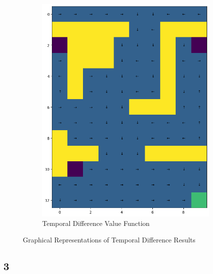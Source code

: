 \begin{figure}[H]
\begin{subfigure}[b]{0.49\textwidth}
        \centering
        \includegraphics[width=\textwidth]{assets/td/td_policy.png}        
        \caption{Temporal Difference Value Function}
    \end{subfigure}
    \caption*{Graphical Representations of Temporal Difference Results}
\end{figure} 


\subsection*{3}


